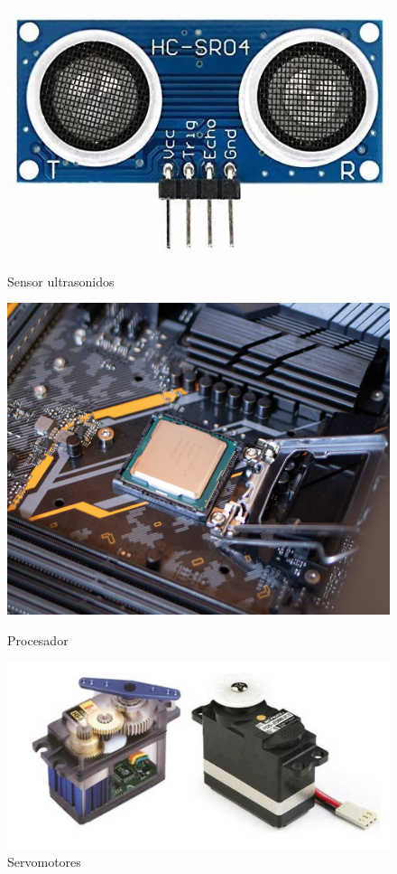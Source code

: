 \begin{figure}[H] 
  \label{ fig7} 
  \begin{minipage}[b]{0.5\linewidth}
    \centering
    \includegraphics[width=.65\linewidth]{chapters/images/us.jpg} 
    \caption{Sensor ultrasonidos} 
  \end{minipage}%
  \begin{minipage}[b]{0.5\linewidth}
    \centering
    \includegraphics[width=.65\linewidth]{chapters/images/procesador.png} 
    \caption{Procesador} 
  \end{minipage} 
  \begin{minipage}[b]{0.5\linewidth}
    \centering
    \includegraphics[width=.65\linewidth]{chapters/images/motor.png} 
    \caption{Servomotores} 
  \end{minipage}%
  \begin{minipage}[b]{0.5\linewidth}
    \centering

\end{minipage}
\end{figure}
